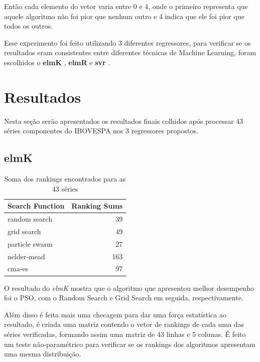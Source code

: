 \documentclass[preprint,12pt]{elsarticle}
\begin{document}
Então cada elemento do vetor varia entre 0 e 4, onde o primeiro representa que aquele algoritmo não foi pior que nenhum outro e 4 indica que ele foi pior que todos os outros.

Esse experimento foi feito utilizando 3 diferentes regressores, para verificar se os resultados eram consistentes entre diferentes técnicas de Machine Learning, foram escolhidos o \textbf{elmK} \cite{GuangBinHuang2012}, \textbf{elmR} \cite{GuangBinHuang2012} e \textbf{svr} \cite{drucker1997support}.


\section{Resultados}

Nesta seção serão apresentados os resultados finais colhidos após processar 43 séries componentes do IBOVESPA nos 3 regressores propostos.


\subsection{elmK}



\begin{table}[h]
	\centering
	\begin{tabular}{lr}
		\hline
		Search Function   &   Ranking Sums \\
		\hline
		random search     &             39 \\
		grid search       &             49 \\
		particle swarm    &             27 \\
		nelder-mead       &            163 \\
		cma-es            &             97 \\
		\hline
	\end{tabular}
	\caption{Soma dos rankings encontrados para as 43 séries}
\end{table}

O resultado do \textit{elmK} mostra que o algoritmo que apresentou melhor desempenho foi o PSO, com o Random Search e Grid Search em seguida, respectivamente.

Além disso é feita mais uma checagem para dar uma força estatística ao resultado, é criada uma matriz contendo o vetor de rankings de cada uma das séries verificadas, formando assim uma matriz de 43 linhas e 5 colunas. É feito um teste não-paramétrico para verificar se os rankings dos algoritmos apresentam uma mesma distribuição.
\end{document}

